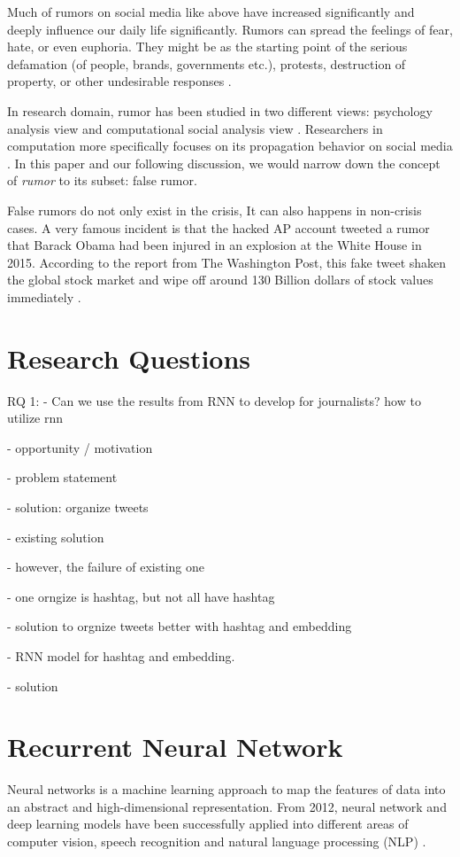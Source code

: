 Much of rumors on social media like above have increased significantly and deeply influence our daily life significantly. Rumors can spread the feelings of fear, hate, or even euphoria. They might be as the starting point of the serious defamation (of people, brands, governments etc.), protests, destruction of property, or other undesirable responses \cite{Nourbakhsh2015}. 

In research domain, rumor has been studied in two different views: psychology analysis view and computational social analysis view \cite{Donovan2007}. Researchers in computation more specifically focuses on its propagation behavior on social media \cite{Qazvinian2011}. In this paper and our following discussion, we would narrow down the concept of \textit{rumor} to its subset: false rumor. 

False rumors do not only exist in the crisis, It can also happens in non-crisis cases. A very famous incident is that the hacked AP account tweeted a rumor that Barack Obama had been injured in an explosion at the White House in 2015. According to the report from The Washington Post, this fake tweet shaken the global stock market and wipe off around 130 Billion dollars of stock values immediately \cite{Fisher2013}. 

\section{Research Questions}

RQ 1:
- Can we use the results from RNN to develop for journalists? 
how to utilize rnn 


- opportunity / motivation

- problem statement

- solution: organize tweets

- existing solution

- however, the failure of existing one

- one orngize is hashtag, but not all have hashtag

- solution to orgnize tweets better with hashtag and embedding
 
- RNN model for hashtag and embedding. 

- solution 



\section{Recurrent Neural Network}
Neural networks is a machine learning approach to map the features of data into an abstract and high-dimensional representation. From 2012, neural network and deep learning models have been successfully applied into different areas of computer vision, speech recognition and natural language processing (NLP) \cite{LeCun2015}. 

